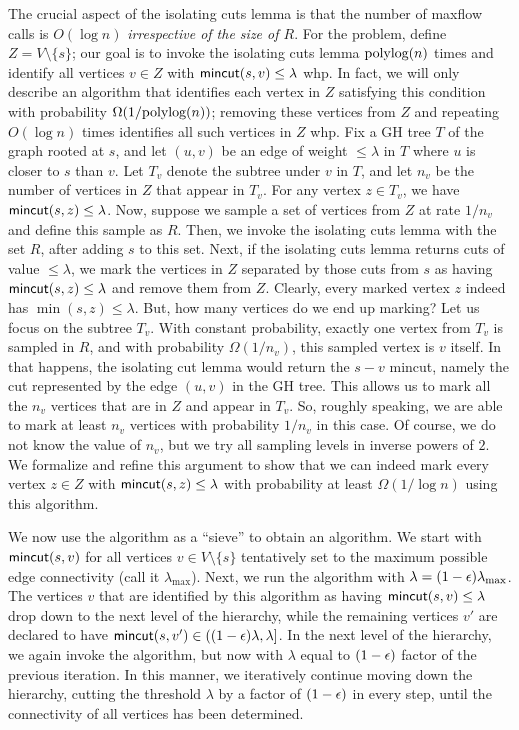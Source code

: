 \EL
%
The crucial aspect of the isolating cuts lemma is that the number of maxflow calls is $O(\log n)$ {\em irrespective of the size of $R$}. For the \ct problem, define $Z= V\setminus \{s\}$; our goal is to invoke the isolating cuts lemma $\textup{polylog}(n)$ times and identify all vertices $v\in Z$ with $\textsf{\textup{mincut}}(s, v)\le \lambda$ whp. In fact, we will only describe an algorithm that identifies each vertex in $Z$ satisfying this condition with probability $\Omega(1/\textup{polylog}(n))$; removing these vertices from $Z$ and repeating $O(\log n)$ times identifies all such vertices in $Z$ whp. Fix a GH tree $T$ of the graph rooted at $s$, and let $(u, v)$ be an edge of weight $\le \lambda$ in $T$ where $u$ is closer to $s$ than $v$. Let $T_v$ denote the subtree under $v$ in $T$, and let $n_v$ be the number of vertices in $Z$ that appear in $T_v$. For any vertex $z\in T_v$, we have $\textsf{\textup{mincut}}(s, z) \le \lambda$. Now, suppose we sample a set of vertices from $Z$ at rate $1/n_v$ and define this sample as $R$. Then, we invoke the isolating cuts lemma with the set $R$, after adding $s$ to this set. Next, if the isolating cuts lemma returns cuts of value $\le \lambda$, we mark the vertices in $Z$ separated by those cuts from $s$ as having $\textsf{\textup{mincut}}(s, z)\le \lambda$ and remove them from $Z$. Clearly, every marked vertex $z$ indeed has $\min(s, z)\le \lambda$. But, how many vertices do we end up marking? Let us focus on the subtree $T_v$. With constant probability, exactly one vertex from $T_v$ is sampled in $R$, and with probability $\Omega(1/n_v)$, this sampled vertex is $v$ itself. In that happens, the isolating cut lemma would return the $s-v$ mincut, namely the cut represented by the edge $(u, v)$ in the GH tree. This allows us to mark all the $n_v$ vertices that are in $Z$ and appear in $T_v$. So, roughly speaking, we are able to mark at least $n_v$ vertices with probability $1/n_v$ in this case. Of course, we do not know the value of $n_v$, but we try all sampling levels in inverse powers of $2$. We formalize and refine this argument to show that we can indeed mark every vertex $z\in Z$ with $\textsf{\textup{mincut}}(s, z) \le \lambda$ with probability at least $\Omega(1/\log n)$ using this algorithm.

We now use the \ct algorithm as a ``sieve'' to obtain an \ssc algorithm. We start with $\textsf{\textup{mincut}}(s, v)$ for all vertices $v\in V\setminus \{s\}$ tentatively set to the maximum possible edge connectivity (call it $\lambda_{\max}$). Next, we run the \ct algorithm with $\lambda = (1-\epsilon) \lambda_{\max}$. The vertices $v$ that are identified by this algorithm as having $\textsf{\textup{mincut}}(s, v) \le \lambda$ drop down to the next level of the hierarchy, while the remaining vertices $v'$ are declared to have $\textsf{\textup{mincut}}(s, v') \in ((1-\epsilon)\lambda, \lambda]$. In the next level of the hierarchy, we again invoke the \ct algorithm, but now with $\lambda$ equal to $(1-\epsilon)$ factor of the previous iteration. In this manner, we iteratively continue moving down the hierarchy, cutting the threshold $\lambda$ by a factor of $(1-\epsilon)$ in every step, until the connectivity of all vertices has been determined.

